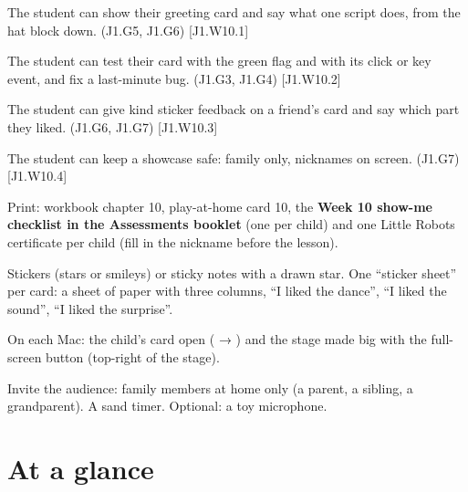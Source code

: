 
\begin{objectives}
  \item The student can show their greeting card and say what one script does, from the hat block down. (J1.G5, J1.G6) [J1.W10.1]
  \item The student can test their card with the green flag and with its click or key event, and fix a last-minute bug. (J1.G3, J1.G4) [J1.W10.2]
  \item The student can give kind sticker feedback on a friend's card and say which part they liked. (J1.G6, J1.G7) [J1.W10.3]
  \item The student can keep a showcase safe: family only, nicknames on screen. (J1.G7) [J1.W10.4]
\end{objectives}

\begin{materials}
  \item Print: workbook chapter 10, play-at-home card 10, the \textbf{Week 10 show-me checklist in the Assessments booklet} (one per child) and one Little Robots certificate per child (fill in the nickname before the lesson).
  \item Stickers (stars or smileys) or sticky notes with a drawn star. One \enquote{sticker sheet} per card: a sheet of paper with three columns, \enquote{I liked the dance}, \enquote{I liked the sound}, \enquote{I liked the surprise}.
  \item On each Mac: the child's card open ( → ) and the stage made big with the full-screen button (top-right of the stage).
  \item Invite the audience: family members at home only (a parent, a sibling, a grandparent). A sand timer. Optional: a toy microphone.
\end{materials}

\section{At a glance}
\begin{timeplan}
\end{timeplan}

